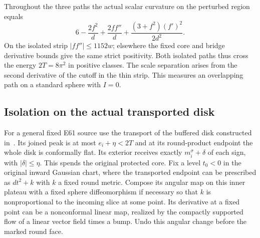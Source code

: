 \documentclass[11pt,letterpaper]{article}
\numberwithin{equation}{section}
\begin{document}
Throughout the three paths the actual scalar curvature on the
perturbed region equals
\[
 6-\frac{2f^2}{d}+\frac{2ff''}{d}
                   +\frac{(3+f^2)(f')^2}{2d^2}.
\]
On the isolated strip \(|ff''|\le1152w\); elsewhere the fixed
core and bridge derivative bounds give the same strict
positivity. Both isolated paths thus cross the energy
\(2T=8\pi^2\) in positive classes. The scale separation arises
from the second derivative of the cutoff in the thin strip.
This measures an overlapping path on a standard sphere with \(I=0\).

\subsection{Isolation on the actual transported disk}\label{sec:transported-isolation}
For a general fixed E61 source use the transport of the buffered
disk constructed in~\cite{Baker2026CollarProgram}. Its joined peak
is at most \(e_i+\eta<2T\) and at its round-product endpoint
the whole disk is conformally flat. Its exterior receives exactly
\(m_i^\sigma+\delta\) of each sign, with \(|\delta|\le\eta\).
This spends the original protected core. Fix a level \(t_0<0\)
in the original inward Gaussian chart, where the transported
endpoint can be prescribed as \(dt^2+k\) with \(k\) a fixed
round metric. Compose its angular map on this inner plateau with
a fixed sphere diffeomorphism if necessary so that \(k\) is
nonproportional to the incoming slice at some point. Its derivative
at a fixed point can be a nonconformal linear map, realized by
the compactly supported flow of a linear vector field times a
bump. Undo this angular change before the marked round face.
\end{document}
